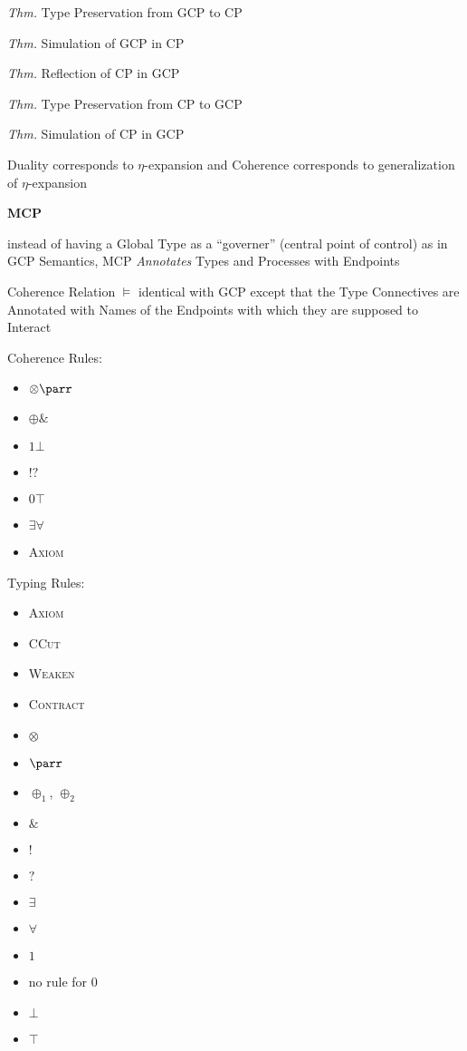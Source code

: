 \emph{Thm.} Type Preservation from GCP to CP

\emph{Thm.} Simulation of GCP in CP

\emph{Thm.} Reflection of CP in GCP

\emph{Thm.} Type Preservation from CP to GCP

\emph{Thm.} Simulation of CP in GCP

Duality corresponds to $\eta$-expansion and Coherence corresponds to
generalization of $\eta$-expansion


\textbf{MCP}

instead of having a Global Type as a ``governer'' (central point of
control) as in GCP Semantics, MCP \emph{Annotates} Types and Processes
with Endpoints

Coherence Relation $\vDash$ identical with GCP except that the Type
Connectives are Annotated with Names of the Endpoints with which they
are supposed to Interact

Coherence Rules:
\begin{itemize}
  \item $\otimes\parr$
  \item $\oplus\&$
  \item $1\bot$
  \item $!?$
  \item $0\top$
  \item $\exists\forall$
  \item \textsc{Axiom}
\end{itemize}

Typing Rules:
\begin{itemize}
  \item \textsc{Axiom}
  \item \textsc{CCut}
  \item \textsc{Weaken}
  \item \textsc{Contract}
  \item $\otimes$
  \item $\parr$
  \item $\oplus_1$, $\oplus_2$
  \item $\&$
  \item $!$
  \item $?$
  \item $\exists$
  \item $\forall$
  \item $1$
  \item no rule for $0$
  \item $\bot$
  \item $\top$
\end{itemize}


